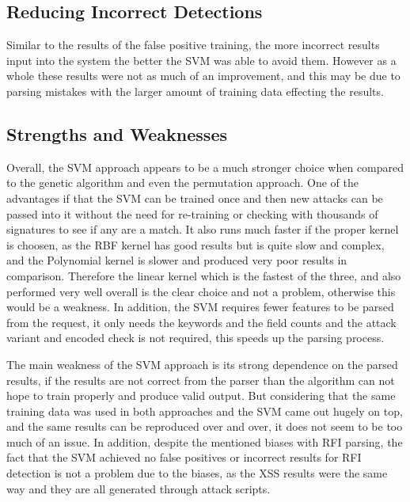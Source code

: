 \subsection{Reducing Incorrect Detections}

Similar to the results of the false positive training, the more incorrect results input into the system the better the SVM was able to avoid them.  However as a whole these results were not as much of an improvement, and this may be due to parsing mistakes with the larger amount of training data effecting the results.

\subsection{Strengths and Weaknesses}\label{sec:svmDisadvantages}

Overall, the SVM approach appears to be a much stronger choice when compared to the genetic algorithm and even the permutation approach.  One of the advantages if that the SVM can be trained once and then new attacks can be passed into it without the need for re-training or checking with thousands of signatures to see if any are a match.  It also runs much faster if the proper kernel is choosen, as the RBF kernel has good results but is quite slow and complex, and the Polynomial kernel is slower and produced very poor results in comparison.  Therefore the linear kernel which is the fastest of the three, and also performed very well overall is the clear choice and not a problem, otherwise this would be a weakness.  In addition, the SVM requires fewer features to be parsed from the request, it only needs the keywords and the field counts and the attack variant and encoded check is not required, this speeds up the parsing process.

The main weakness of the SVM approach is its strong dependence on the parsed results, if the results are not correct from the parser than the algorithm can not hope to train properly and produce valid output.  But considering that the same training data was used in both approaches and the SVM came out hugely on top, and the same results can be reproduced over and over, it does not seem to be too much of an issue.  In addition, despite the mentioned biases with RFI parsing, the fact that the SVM achieved no false positives or incorrect results for RFI detection is not a problem due to the biases, as the XSS results were the same way and they are all generated through attack scripts.

